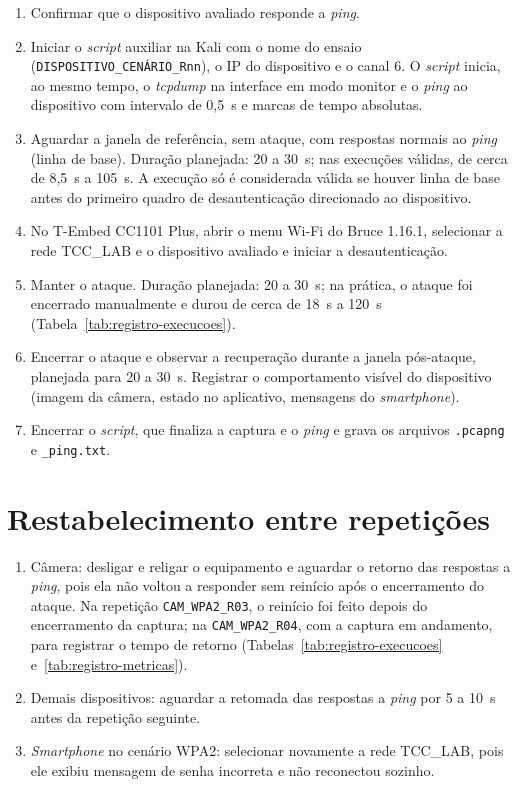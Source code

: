 \begin{enumerate}
    \item Confirmar que o dispositivo avaliado responde a \textit{ping}.
    \item Iniciar o \textit{script} auxiliar na Kali com o nome do ensaio (\texttt{DISPOSITIVO\_CENÁRIO\_Rnn}), o IP do dispositivo e o canal 6. O \textit{script} inicia, ao mesmo tempo, o \textit{tcpdump} na interface em modo monitor e o \textit{ping} ao dispositivo com intervalo de 0,5~s e marcas de tempo absolutas.
    \item Aguardar a janela de referência, sem ataque, com respostas normais ao \textit{ping} (linha de base). Duração planejada: 20 a 30~s; nas execuções válidas, de cerca de 8,5~s a 105~s. A execução só é considerada válida se houver linha de base antes do primeiro quadro de desautenticação direcionado ao dispositivo.
    \item No T-Embed CC1101 Plus, abrir o menu Wi-Fi do Bruce 1.16.1, selecionar a rede TCC\_LAB e o dispositivo avaliado e iniciar a desautenticação.
    \item Manter o ataque. Duração planejada: 20 a 30~s; na prática, o ataque foi encerrado manualmente e durou de cerca de 18~s a 120~s (Tabela~\ref{tab:registro-execucoes}).
    \item Encerrar o ataque e observar a recuperação durante a janela pós-ataque, planejada para 20 a 30~s. Registrar o comportamento visível do dispositivo (imagem da câmera, estado no aplicativo, mensagens do \textit{smartphone}).
    \item Encerrar o \textit{script}, que finaliza a captura e o \textit{ping} e grava os arquivos \texttt{.pcapng} e \texttt{\_ping.txt}.
\end{enumerate}

\section{Restabelecimento entre repetições}

\begin{enumerate}
    \item Câmera: desligar e religar o equipamento e aguardar o retorno das respostas a \textit{ping}, pois ela não voltou a responder sem reinício após o encerramento do ataque. Na repetição \texttt{CAM\_WPA2\_R03}, o reinício foi feito depois do encerramento da captura; na \texttt{CAM\_WPA2\_R04}, com a captura em andamento, para registrar o tempo de retorno (Tabelas~\ref{tab:registro-execucoes} e~\ref{tab:registro-metricas}).
    \item Demais dispositivos: aguardar a retomada das respostas a \textit{ping} por 5 a 10~s antes da repetição seguinte.
    \item \textit{Smartphone} no cenário WPA2: selecionar novamente a rede TCC\_LAB, pois ele exibiu mensagem de senha incorreta e não reconectou sozinho.
\end{enumerate}

